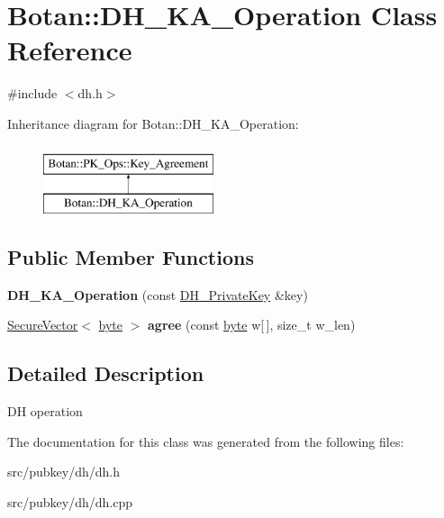 \hypertarget{classBotan_1_1DH__KA__Operation}{\section{Botan\-:\-:D\-H\-\_\-\-K\-A\-\_\-\-Operation Class Reference}
\label{classBotan_1_1DH__KA__Operation}
}


{\ttfamily \#include $<$dh.\-h$>$}

Inheritance diagram for Botan\-:\-:D\-H\-\_\-\-K\-A\-\_\-\-Operation\-:\begin{figure}[H]
\begin{center}
\leavevmode
\includegraphics[height=2.000000cm]{classBotan_1_1DH__KA__Operation}
\end{center}
\end{figure}
\subsection*{Public Member Functions}
\begin{DoxyCompactItemize}
\item 
\hypertarget{classBotan_1_1DH__KA__Operation_ac599d1c2c94ca997632cef99840a952a}{{\bfseries D\-H\-\_\-\-K\-A\-\_\-\-Operation} (const \hyperlink{classBotan_1_1DH__PrivateKey}{D\-H\-\_\-\-Private\-Key} \&key)}\label{classBotan_1_1DH__KA__Operation_ac599d1c2c94ca997632cef99840a952a}

\item 
\hypertarget{classBotan_1_1DH__KA__Operation_a2d694a0151b3fcc48da5c5939dab7bd4}{\hyperlink{classBotan_1_1SecureVector}{Secure\-Vector}$<$ \hyperlink{namespaceBotan_a7d793989d801281df48c6b19616b8b84}{byte} $>$ {\bfseries agree} (const \hyperlink{namespaceBotan_a7d793989d801281df48c6b19616b8b84}{byte} w\mbox{[}$\,$\mbox{]}, size\-\_\-t w\-\_\-len)}\label{classBotan_1_1DH__KA__Operation_a2d694a0151b3fcc48da5c5939dab7bd4}

\end{DoxyCompactItemize}


\subsection{Detailed Description}
D\-H operation 

The documentation for this class was generated from the following files\-:\begin{DoxyCompactItemize}
\item 
src/pubkey/dh/dh.\-h\item 
src/pubkey/dh/dh.\-cpp\end{DoxyCompactItemize}
